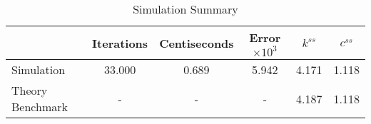 \begin{table}[htb]
\centering
\caption{Simulation Summary}
\label{table:psCp2:tab:sim2c}
\begin{tabular}{lccccc}
\hline
 & Iterations & Centiseconds & Error$\times 10^3$ & $k^{ss}$ & $c^{ss}$ \\
\hline\hline
Simulation & 33.000 & 0.689 & 5.942 & 4.171 & 1.118 \\
Theory Benchmark & - & - & - & 4.187 & 1.118 \\
\hline
\end{tabular}
\end{table}
